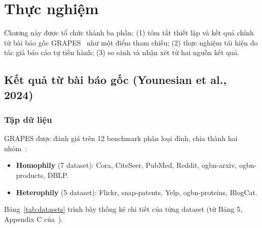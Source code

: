 \chapter{Thực nghiệm}

Chương này được tổ chức thành ba phần: (1) tóm tắt thiết lập và kết quả chính từ bài báo gốc GRAPES~\cite{Younesian2023GRAPES} như một điểm tham chiếu; (2) thực nghiệm tái hiện do tác giả báo cáo tự tiến hành; (3) so sánh và nhận xét từ hai nguồn kết quả.

\section{Kết quả từ bài báo gốc (Younesian et al., 2024)}

\subsection{Tập dữ liệu}

GRAPES được đánh giá trên 12 benchmark phân loại đỉnh, chia thành hai nhóm~\cite{Younesian2023GRAPES}:
\begin{itemize}
    \item \textbf{Homophily} (7 dataset): Cora, CiteSeer, PubMed, Reddit, ogbn-arxiv, ogbn-products, DBLP.
    \item \textbf{Heterophily} (5 dataset): Flickr, snap-patents, Yelp, ogbn-proteins, BlogCat.
\end{itemize}

Bảng~\ref{tab:datasets} trình bày thống kê chi tiết của từng dataset (từ Bảng 5, Appendix C của~\cite{Younesian2023GRAPES}).

